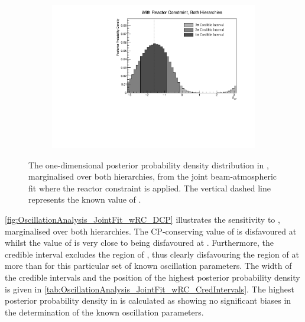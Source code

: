 \begin{figure}[h]
  \begin{subfigure}[t]{0.98\textwidth}
    \includegraphics[width=\textwidth, trim={0mm 0mm 0mm 0mm}, clip,page=1]{Figures/OA/JointFit_wRC/Contours_1D_dcp_BH_1_wRC_UnSmeared_CredibleInterval.pdf}
  \end{subfigure}
  \caption{The one-dimensional posterior probability density distribution in , marginalised over both hierarchies, from the joint beam-atmospheric fit where the reactor constraint is applied. The vertical dashed line represents the known value of .}
  \label{fig:OscillationAnalysis_JointFit_wRC_DCP}
\end{figure}

\autoref{fig:OscillationAnalysis_JointFit_wRC_DCP} illustrates the sensitivity to , marginalised over both hierarchies. The CP-conserving value of  is disfavoured at \quickmath{2\sigma} whilst the value of  is very close to being disfavoured at \quickmath{2\sigma}. Furthermore, the \quickmath{3\sigma} credible interval excludes the region of , thus clearly disfavouring the region of  at more than \quickmath{3\sigma} for this particular set of known oscillation parameters. The width of the \quickmath{1\sigma} credible intervals and the position of the highest posterior probability density is given in \autoref{tab:OscillationAnalysis_JointFit_wRC_CredIntervals}. The highest posterior probability density in  is calculated as  showing no significant biases in the determination of the known oscillation parameters.

